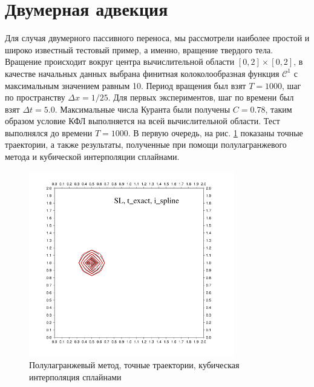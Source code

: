\section*{Двумерная адвекция} \label{sect6_2}
Для случая двумерного пассивного переноса, мы рассмотрели наиболее простой и широко известный тестовый пример, а именно, вращение твердого тела. Вращение происходит вокруг центра вычислительной области $[0,2]\times[0,2]$,  в качестве начальных данных выбрана финитная колоколообразная функция $\mathcal{C}^1$ с максимальным значением равным 10. Период вращения был взят $T=1000$, шаг по пространству $\Delta x = 1/25$. Для первых экспериментов, шаг по времени был взят $\Delta t = 5.0$. Максимальные числа Куранта были получены $C=0.78$, таким образом условие КФЛ выполняется на всей вычислительной области. Тест выполнялся до времени $T=1000$. В первую очередь, на рис. \ref{img:6_4} показаны точные траектории, а также результаты, полученные при помощи полулагранжевого метода и кубической интерполяции сплайнами.
%
\begin{figure}[ht] 
	\centering
	\includegraphics[width=0.8\textwidth,height=0.8\textwidth]{images/6_4}
	\caption{Полулагранжевый метод, точные траектории, кубическая интерполяция сплайнами}
	\label{img:6_4}
\end{figure}
%
%
